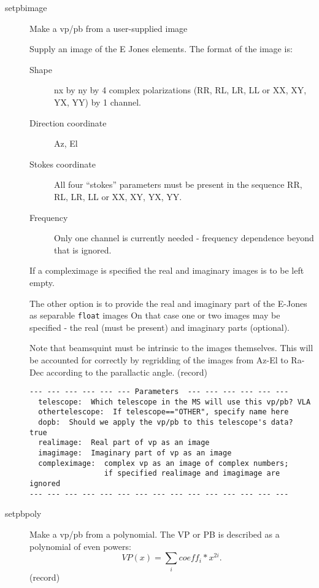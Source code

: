 \documentclass[12pt]{article}
\begin{document}
\begin{description}
 
  \item[setpbimage]
   Make a vp/pb from a user-supplied image

   Supply an image of the E Jones elements. The format of the 
   image is:
   \begin{description}
   \item[Shape] nx by ny by 4 complex polarizations (RR, RL, LR, LL or
     XX, XY, YX, YY) by 1 channel.
   \item[Direction coordinate] Az, El
   \item[Stokes coordinate] All four ``stokes'' parameters must be present
     in the sequence RR, RL, LR, LL or XX, XY, YX, YY.
   \item[Frequency] Only one channel is currently needed - frequency 
     dependence beyond that is ignored. 
   \end{description}

   If a compleximage is specified the real and imaginary images is to be left empty.

   The other option is to provide the real and imaginary part of the E-Jones as separable {\tt float} images
   On that case
   one or two images may be specified - the real (must be present) and
   imaginary parts (optional). 

   Note that beamsquint must be intrinsic to the images themselves.
   This will be accounted for correctly by regridding of the images
   from Az-El to Ra-Dec according to the parallactic angle.
   (record)
 
{\small
\begin{verbatim}
--- --- --- --- --- --- Parameters  --- --- --- --- --- ---
  telescope:  Which telescope in the MS will use this vp/pb? VLA 
  othertelescope:  If telescope=="OTHER", specify name here 
  dopb:  Should we apply the vp/pb to this telescope's data? true 
  realimage:  Real part of vp as an image 
  imagimage:  Imaginary part of vp as an image 
  compleximage:  complex vp as an image of complex numbers; 
                 if specified realimage and imagimage are ignored 
--- --- --- --- --- --- --- --- --- --- --- --- --- --- ---
\end{verbatim} 
} 


  \item[setpbpoly]
   Make a vp/pb from a polynomial.
   The VP or PB is described as a polynomial of even powers:
   \begin{equation}
     VP(x) = \sum_{i} coeff_{i} * x^{2i}.
   \end{equation}
   (record)


\end{description}
\end{document}
